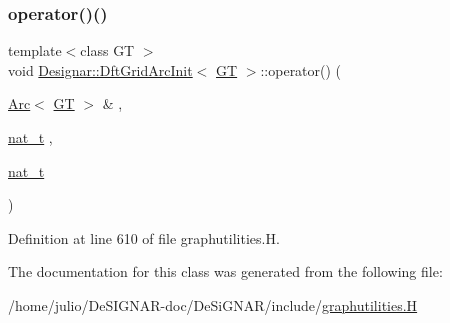 \subsubsection{\texorpdfstring{operator()()}{operator()()}}
{\footnotesize\ttfamily template$<$class GT $>$ \\
void \hyperlink{class_designar_1_1_dft_grid_arc_init}{Designar\+::\+Dft\+Grid\+Arc\+Init}$<$ \hyperlink{demo-buildgraph_8_c_a3001c40d2c31ca87ed96cd7d1334a55e}{GT} $>$\+::operator() (\begin{DoxyParamCaption}\item[{\hyperlink{namespace_designar_a3f55fb5513d62ff47cbc8f72b8e95d6f}{Arc}$<$ \hyperlink{demo-buildgraph_8_c_a3001c40d2c31ca87ed96cd7d1334a55e}{GT} $>$ \&}]{,  }\item[{\hyperlink{namespace_designar_aa72662848b9f4815e7bf31a7cf3e33d1}{nat\+\_\+t}}]{,  }\item[{\hyperlink{namespace_designar_aa72662848b9f4815e7bf31a7cf3e33d1}{nat\+\_\+t}}]{ }\end{DoxyParamCaption})\hspace{0.3cm}{\ttfamily [inline]}}



Definition at line 610 of file graphutilities.\+H.



The documentation for this class was generated from the following file\+:\begin{DoxyCompactItemize}
\item 
/home/julio/\+De\+S\+I\+G\+N\+A\+R-\/doc/\+De\+Si\+G\+N\+A\+R/include/\hyperlink{graphutilities_8_h}{graphutilities.\+H}\end{DoxyCompactItemize}
